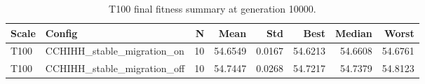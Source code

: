 \begin{table}[htbp]
\centering
\caption{T100 final fitness summary at generation 10000.}
\label{tab:t100_final_fitness_summary}
\begin{tabular}{llrrrrrr}
\toprule
Scale & Config & N & Mean & Std & Best & Median & Worst \\
\midrule
T100 & CCHIHH_stable_migration_on & 10 & 54.6549 & 0.0167 & 54.6213 & 54.6608 & 54.6761 \\
T100 & CCHIHH_stable_migration_off & 10 & 54.7447 & 0.0268 & 54.7217 & 54.7379 & 54.8123 \\
\bottomrule
\end{tabular}
\end{table}
